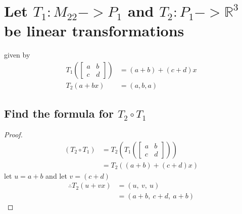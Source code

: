 \documentclass[../main.tex]{subfiles}
\begin{document}
\section[Problem 2]{Let $T_{1}:M_{22}->P_{1}$ and $T_{2}:P_{1}->\mathbb{R}^3$ be linear transformations}
given by
\begin{align*}
  T_{1}\left(\begin{bmatrix}
      a & b \\
      c & d
    \end{bmatrix}\right) & =( a+b) +( c+d) x \\
  T_{2}( a+bx)                                & =( a,b,a)
\end{align*}
\subsection{Find the formula for $T_{2} \circ T_{1}$ }
\begin{proof}

  \begin{equation*}
    \begin{aligned}
      ( T_{2} \circ T_{1}) & =T_{2}\left( T_{1}\left(\begin{bmatrix}
          a & b \\
          c & d
        \end{bmatrix}\right)\right) \\
                           & =T_{2}(( a+b) +( c+d) x)
    \end{aligned}
  \end{equation*}
  let $\displaystyle u=a+b$ and let $\displaystyle v=( c+d)$
  \begin{align*}
    \therefore T_{2}( u+vx) & =( u,\ v,\ u)       \\
                            & =( a+b,\ c+d,\ a+b)
  \end{align*}
\end{proof}
\end{document}
